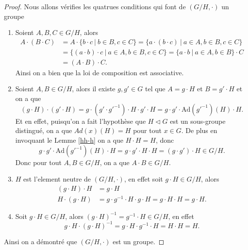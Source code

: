 \documentclass[french]{article}
\theoremstyle{plain}
\theoremstyle{remark}
\theoremstyle{definition}
\newcommand{\Ad}{\mathrm{Ad}}
\begin{document}
\begin{proof}
	Nous allons vérifies les quatrues conditions qui font de $(G/H, \cdot)$ un groupe
	\begin{enumerate}
		\item Soient $A, B, C \in G/H$, alors
			\begin{align*}
				A \cdot (B \cdot C) &= A \cdot \{b \cdot c\ |\ b \in B, c \in C\}
					= \{a \cdot (b \cdot c)\ |\ a \in A, b \in B, c \in C\}\\
				&= \{(a \cdot b) \cdot c\ |\ a \in A, b \in B, c \in C\}
					= \{a \cdot b\ |\ a \in A, b \in B\} \cdot C\\
				&= (A \cdot B) \cdot C.
			\end{align*}
			Ainsi on a bien que la loi de composition est associative.
		\item Soient $A, B \in G/H$, alors il existe $g, g' \in G$ tel que $A = g \cdot H$ et
			$B = g' \cdot H$ et on a que	
			\begin{equation*}
				(g \cdot H) \cdot (g' \cdot H)
				= g \cdot (g' \cdot g'^{-1}) \cdot H \cdot g' \cdot H
				= g \cdot g' \cdot \Ad(g'^{-1})(H) \cdot H.
			\end{equation*}
			Et en effet, puisqu'on a fait l'hypothèse que $H \triangleleft G$
			est un sous-groupe distingué,
			on a que ${Ad(x)(H) = H}$ pour tout $x \in G$.
			De plus en invoquant le Lemme \ref{hh-h} on a que $H \cdot H = H$, donc
			\begin{equation*}
				g \cdot g' \cdot \Ad(g'^{-1})(H) \cdot H = g \cdot g' \cdot H \cdot H
				= (g \cdot g') \cdot H \in G/H.
			\end{equation*}
			Donc pour tout $A, B \in G/H$, on a que $A \cdot B \in G/H$.
		\item $H$ est l'element neutre de $(G/H, \cdot)$,
			en effet soit $g \cdot H \in G/H$, alors 
			\begin{align*}
				(g \cdot H) \cdot H &= g \cdot H\\
				H \cdot (g \cdot H) &= g \cdot g^{-1} \cdot H \cdot g \cdot H
				= g \cdot H \cdot H = g \cdot H.
			\end{align*}
		\item Soit $g \cdot H \in G/H$, alors $(g \cdot H)^{-1} = g^{-1} \cdot H \in G/H$,
			en effet
			\begin{equation*}
				g \cdot H \cdot (g \cdot H)^{-1} = g \cdot H \cdot g^{-1} \cdot H
				= H \cdot H = H.
			\end{equation*}
	\end{enumerate}
	Ainsi on a démontré que $(G/H, \cdot)$ est un groupe.
\end{proof}
\end{document}
